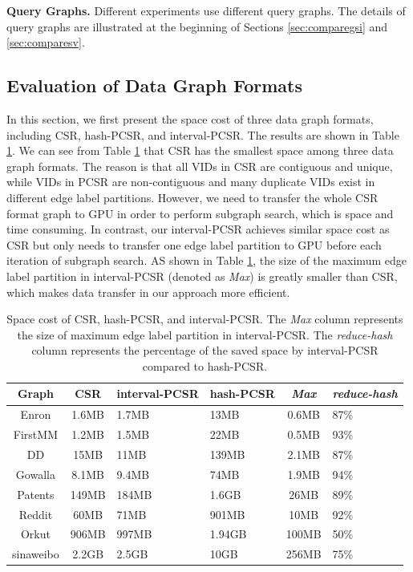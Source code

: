 \textbf{Query Graphs.} Different experiments use different query graphs. The details of query graphs are illustrated at the beginning of Sections \ref{sec:comparegsi} and \ref{sec:comparesv}.

\subsection{Evaluation of Data Graph Formats}
In this section, we first present the space cost of three data graph formats, including CSR, hash-PCSR, and  interval-PCSR. The results are shown in Table \ref{tab:graphsize}. We can see from Table \ref{tab:graphsize} that CSR has the smallest space among three data graph formats. The reason is that all VIDs in CSR are contiguous and unique, while VIDs in PCSR are non-contiguous and many duplicate VIDs exist in different edge label partitions. However, we need to transfer the whole CSR format graph to GPU in order to perform subgraph search, which is space and time consuming. In contrast, our interval-PCSR achieves similar space cost as CSR but only needs to transfer one edge label partition to GPU before each iteration of subgraph search. AS shown in Table \ref{tab:graphsize}, the size of the maximum edge label partition in interval-PCSR (denoted as \emph{Max}) is greatly smaller than CSR, which makes data transfer in our approach more efficient.


\begin{table}
\centering
  \caption{Space cost of CSR, hash-PCSR, and interval-PCSR. The \emph{Max} column represents the size of maximum edge label partition in interval-PCSR. The \emph{reduce-hash} column represents the percentage of the saved space by interval-PCSR compared to hash-PCSR.}
  \label{tab:graphsize}
  \begin{tabular}{ccp{30pt}p{30pt}cp{30pt}}
  \hline
    Graph &CSR&interval-PCSR&hash-PCSR&\emph{Max}&\emph{reduce-hash}\\
    \hline
    Enron 		&1.6MB	&1.7MB	&13MB	&0.6MB	&87\% \\
    FirstMM 	&1.2MB	&1.5MB	&22MB	&0.5MB	&93\% \\
    DD 			&15MB	&11MB	&139MB	&2.1MB	&87\% \\
    Gowalla 	&8.1MB	&9.4MB	&74MB	&1.9MB	&94\% \\
    Patents 	&149MB	&184MB	&1.6GB	&26MB	&89\% \\
    Reddit 		&60MB	&71MB	&901MB	&10MB	&92\% \\
    Orkut 		&906MB	&997MB	&1.94GB	&100MB	&50\% \\
    sinaweibo	&2.2GB	&2.5GB	&10GB	&256MB	&75\% \\

    \hline
  \end{tabular}
\end{table}

